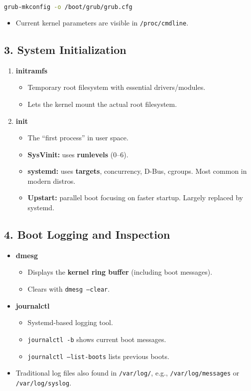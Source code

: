 \documentclass[a4paper]{report}
\begin{document}
\begin{lstlisting}[language=bash]
grub-mkconfig -o /boot/grub/grub.cfg
\end{lstlisting}

\begin{itemize}
    \item Current kernel parameters are visible in \texttt{/proc/cmdline}.
\end{itemize}

\subsection*{3. System Initialization}

\begin{enumerate}
    \item \textbf{initramfs}
    \begin{itemize}
        \item Temporary root filesystem with essential drivers/modules.
        \item Lets the kernel mount the actual root filesystem.
    \end{itemize}
    \item \textbf{init}
    \begin{itemize}
        \item The “first process” in user space.
        \item \textbf{SysVinit:} uses \textbf{runlevels} (0–6).
        \item \textbf{systemd:} uses \textbf{targets}, concurrency, D-Bus, cgroups. Most common in modern distros.
        \item \textbf{Upstart:} parallel boot focusing on faster startup. Largely replaced by systemd.
    \end{itemize}
\end{enumerate}

\subsection*{4. Boot Logging and Inspection}
\begin{itemize}
    \item \textbf{dmesg}
    \begin{itemize}
        \item Displays the \textbf{kernel ring buffer} (including boot messages).
        \item Clears with \texttt{dmesg --clear}.
    \end{itemize}
    \item \textbf{journalctl}
    \begin{itemize}
        \item Systemd-based logging tool.
        \item \texttt{journalctl -b} shows current boot messages.
        \item \texttt{journalctl --list-boots} lists previous boots.
    \end{itemize}
    \item Traditional log files also found in \texttt{/var/log/}, e.g., \texttt{/var/log/messages} or \texttt{/var/log/syslog}.
\end{itemize}
\end{document}
